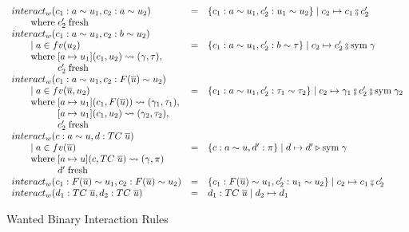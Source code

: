 \begin{figure}
\small
{}
\[
\begin{array}{l c l}
interact_w(c_1 : a \sim u_1, c_2 : a \sim u_2) &=& \{c_1 : a \sim u_1, c_2' :
u_1 \sim u_2\} \mid c_2 \mapsto c_1 \fctrans c_2'
\\ \where c_2' \; \text{fresh}
\\
interact_w(c_1 : a \sim u_1, c_2 : b \sim u_2)
\\ \guard a \in fv(u_2 )&=& \{c_1 : a  \sim u_1, c_2' : b \sim \tau\} \mid
c_2 \mapsto c_2' \fctrans \text{sym} \; \gamma
\\ \where [a \mapsto u_1](c_1, u_2) \rightsquigarrow (\gamma, \tau),
\\ \whereindent c_2' \; \text{fresh}
\\
interact_w(c_1 : a \sim u_1, c_2 : F(\overline{u}) \sim u_2)
\\ \guard a \in fv(\overline{u}, u_2) &=& \{c_1 : a \sim u_1, c_2' : \tau_1
\sim \tau_2\} \mid c_2 \mapsto \gamma_1 \fctrans c_2' \fctrans \text{sym} \;
\gamma_2
\\ \where [a \mapsto u_1](c_1, F(\overline{u})) \rightsquigarrow
(\gamma_1, \tau_1),
\\ \whereindent [a \mapsto u_1](c_1, u_2) \rightsquigarrow
(\gamma_2, \tau_2),
\\ \whereindent c_2' \; \text{fresh}
\\
interact_w(c : a \sim u, d : TC \; \overline{u})
\\ \guard a \in fv(\overline{u}) &=& \{c : a \sim u, d' : \pi\} \mid d
\mapsto d' \triangleright \text{sym} \; \gamma
\\ \where [a \mapsto u](c, TC \; \overline{u}) \rightsquigarrow
(\gamma, \pi)
\\ \whereindent d' \; \text{fresh}
\\
interact_w(c_1 : F(\overline{u}) \sim u_1, c_2 : F(\overline{u}) \sim u_2) &=&
\{c_1 : F(\overline{u}) \sim u_1, c_2' : u_1 \sim u_2\} \mid c_2 \mapsto c_1
\fctrans c_2'
\\
interact_w(d_1 : TC \; \overline{u}, d_2 : TC \; \overline{u}) &=& d_1 : TC \;
\overline{u} \mid d_2 \mapsto d_1
\end{array}
\]
\caption{Wanted Binary Interaction Rules}
\label{fig:interact_w}
\end{figure}

